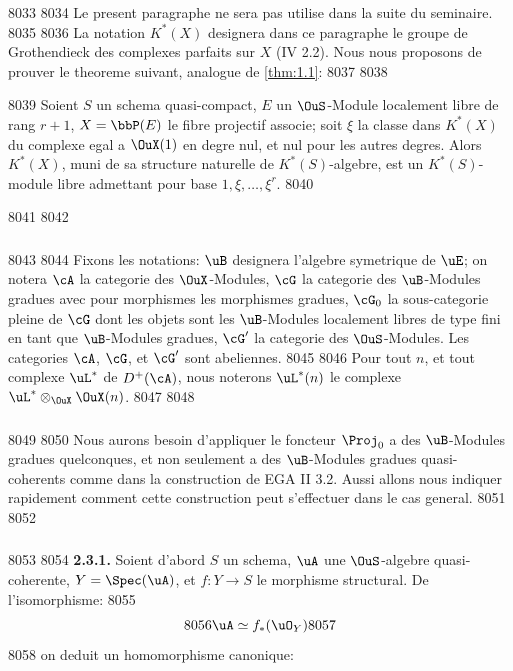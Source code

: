   8033	
  8034	Le present paragraphe ne sera pas utilise dans la suite du seminaire.
  8035	
  8036	La notation $K^*(X)$ designera dans ce paragraphe le groupe de Grothendieck des complexes parfaits sur $X$ (IV 2.2). Nous nous proposons de prouver le theoreme suivant, analogue de \ref{thm:1.1}:
  8037	
  8038	\begin{thm}[2.1]\label{thm:2.1}
  8039	Soient $S$ un schema quasi-compact, $E$ un $\OuS$-Module localement libre de rang $r+1$, $X = \bbP(E)$ le fibre projectif associe; soit $\xi$ la classe dans $K^*(X)$ du complexe egal a $\OuX(1)$ en degre nul, et nul pour les autres degres. Alors $K^*(X)$, muni de sa structure naturelle de $K^*(S)$-algebre, est un $K^*(S)$-module libre admettant pour base $1, \xi, \ldots, \xi^r$.
  8040	\end{thm}
  8041	
  8042	\subsubsection{}
  8043	
  8044	Fixons les notations: $\uB$ designera l'algebre symetrique de $\uE$; on notera $\cA$ la categorie des $\OuX$-Modules, $\cG$ la categorie des $\uB$-Modules gradues avec pour morphismes les morphismes gradues, $\cG_0$ la sous-categorie pleine de $\cG$ dont les objets sont les $\uB$-Modules localement libres de type fini en tant que $\uB$-Modules gradues, $\cG'$ la categorie des $\OuS$-Modules. Les categories $\cA$, $\cG$, et $\cG'$ sont abeliennes.
  8045	
  8046	Pour tout $n$, et tout complexe $\uL^*$ de $D^+(\cA)$, nous noterons $\uL^*(n)$ le complexe $\uL^* \otimes_{\OuX} \OuX(n)$.
  8047	
  8048	\subsubsection{}
  8049	
  8050	Nous aurons besoin d'appliquer le foncteur $\Proj_0$ a des $\uB$-Modules gradues quelconques, et non seulement a des $\uB$-Modules gradues quasi-coherents comme dans la construction de EGA II 3.2. Aussi allons nous indiquer rapidement comment cette construction peut s'effectuer dans le cas general.
  8051	
  8052	\subsubsection{}
  8053	
  8054	\textbf{2.3.1.} Soient d'abord $S$ un schema, $\uA$ une $\OuS$-algebre quasi-coherente, $Y = \Spec(\uA)$, et $f : Y \longrightarrow S$ le morphisme structural. De l'isomorphisme:
  8055	\[
  8056	\uA \simeq f_*(\uO_Y)
  8057	\]
  8058	on deduit un homomorphisme canonique:

